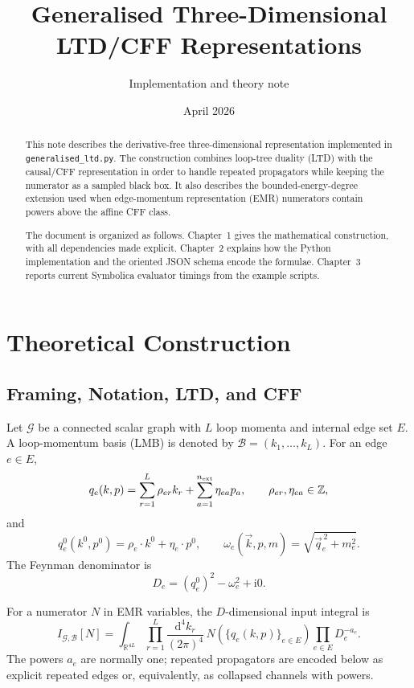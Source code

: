 \documentclass[11pt,a4paper]{report}
\title{Generalised Three-Dimensional LTD/CFF Representations}
\author{Implementation and theory note}
\date{April 2026}
\newcommand{\dd}{\mathrm{d}}
\newcommand{\ii}{\mathrm{i}}
\newcommand{\Graph}{\mathcal G}
\newcommand{\Basis}{\mathcal B}
\begin{document}
\maketitle

\begin{abstract}
This note describes the derivative-free three-dimensional representation
implemented in \texttt{generalised\_ltd.py}.  The construction combines loop-tree
duality (LTD) with the causal/CFF representation in order to handle repeated
propagators while keeping the numerator as a sampled black box.  It also
describes the bounded-energy-degree extension used when edge-momentum
representation (EMR) numerators contain powers above the affine CFF class.

The document is organized as follows.  Chapter~1 gives the mathematical
construction, with all dependencies made explicit.  Chapter~2 explains how the
Python implementation and the oriented JSON schema encode the formulae.
Chapter~3 reports current Symbolica evaluator timings from the example scripts.
\end{abstract}

\tableofcontents

\chapter{Theoretical Construction}

\section{Framing, Notation, LTD, and CFF}

Let \(\Graph\) be a connected scalar graph with \(L\) loop momenta and internal
edge set \(E\).  A loop-momentum basis (LMB) is denoted by
\(\Basis=(k_1,\ldots,k_L)\).  For an edge \(e\in E\),
\begin{equation}
  q_e(k,p)=\sum_{r=1}^{L}\rho_{er}k_r+\sum_{a=1}^{n_{\rm ext}}\eta_{ea}p_a,
  \qquad \rho_{er},\eta_{ea}\in\mathbb Z ,
\end{equation}
and
\begin{equation}
  q_e^0(k^0,p^0)=\rho_e\cdot k^0+\eta_e\cdot p^0,\qquad
  \omega_e(\vec k,p,m)=\sqrt{\vec q_e^{\,2}+m_e^2}.
\end{equation}
The Feynman denominator is
\begin{equation}
  D_e=(q_e^0)^2-\omega_e^2+\ii0 .
\end{equation}

For a numerator \(N\) in EMR variables, the \(D\)-dimensional input integral is
\begin{equation}
  I_{\Graph,\Basis}[N]
  =
  \int_{\mathbb R^{4L}}
  \prod_{r=1}^{L}\frac{\dd^4 k_r}{(2\pi)^4}\,
  N(\{q_e(k,p)\}_{e\in E})
  \prod_{e\in E}D_e^{-a_e}.
  \label{eq:four-dimensional-integral}
\end{equation}
The powers \(a_e\) are normally one; repeated propagators are encoded below as
explicit repeated edges or, equivalently, as collapsed channels with powers.
\end{document}

